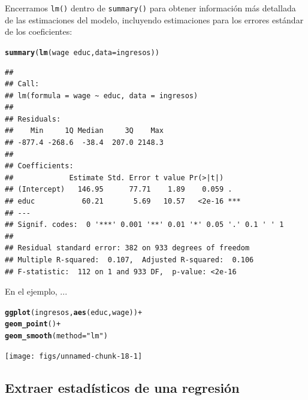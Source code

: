 \documentclass{article}\usepackage[]{graphicx}\usepackage[]{color}
\makeatletter
\newcommand{\hlstr}[1]{\textcolor[rgb]{0.192,0.494,0.8}{#1}}%
\newcommand{\hlopt}[1]{\textcolor[rgb]{0,0,0}{#1}}%
\newcommand{\hlstd}[1]{\textcolor[rgb]{0.345,0.345,0.345}{#1}}%
\newcommand{\hlkwc}[1]{\textcolor[rgb]{0.333,0.667,0.333}{#1}}%
\newcommand{\hlkwd}[1]{\textcolor[rgb]{0.737,0.353,0.396}{\textbf{#1}}}%
\newenvironment{kframe}{%
 \def\at@end@of@kframe{}%
 \ifinner\ifhmode%
  \def\at@end@of@kframe{\end{minipage}}%
  \begin{minipage}{\columnwidth}%
 \fi\fi%
 \def\FrameCommand##1{\hskip\@totalleftmargin \hskip-\fboxsep
 \colorbox{shadecolor}{##1}\hskip-\fboxsep
     \hskip-\linewidth \hskip-\@totalleftmargin \hskip\columnwidth}%
 \MakeFramed {\advance\hsize-\width
   \@totalleftmargin\z@ \linewidth\hsize
   \@setminipage}}%
 {\par\unskip\endMakeFramed%
 \at@end@of@kframe}
\newenvironment{knitrout}{}{} %
\makeatother
\begin{document}
Encerramos \verb|lm()| dentro de \verb|summary()| para obtener información más detallada de las estimaciones del modelo, incluyendo estimaciones para los errores estándar de los coeficientes:

\begin{knitrout}
\color{fgcolor}\begin{kframe}
\begin{alltt}
\hlkwd{summary}\hlstd{(}\hlkwd{lm}\hlstd{(wage} \hlopt{~} \hlstd{educ,} \hlkwc{data} \hlstd{= ingresos))}
\end{alltt}
\begin{verbatim}
## 
## Call:
## lm(formula = wage ~ educ, data = ingresos)
## 
## Residuals:
##    Min     1Q Median     3Q    Max 
## -877.4 -268.6  -38.4  207.0 2148.3 
## 
## Coefficients:
##             Estimate Std. Error t value Pr(>|t|)    
## (Intercept)   146.95      77.71    1.89    0.059 .  
## educ           60.21       5.69   10.57   <2e-16 ***
## ---
## Signif. codes:  0 '***' 0.001 '**' 0.01 '*' 0.05 '.' 0.1 ' ' 1
## 
## Residual standard error: 382 on 933 degrees of freedom
## Multiple R-squared:  0.107,	Adjusted R-squared:  0.106 
## F-statistic:  112 on 1 and 933 DF,  p-value: <2e-16
\end{verbatim}
\end{kframe}
\end{knitrout}

En el ejemplo, ...


\begin{knitrout}
\color{fgcolor}\begin{kframe}
\begin{alltt}
\hlkwd{ggplot}\hlstd{(ingresos,} \hlkwd{aes}\hlstd{(educ, wage))} \hlopt{+}
  \hlkwd{geom_point}\hlstd{()} \hlopt{+}
  \hlkwd{geom_smooth}\hlstd{(}\hlkwc{method} \hlstd{=} \hlstr{"lm"}\hlstd{)}
\end{alltt}
\end{kframe}

{\centering \texttt{[image: figs/unnamed-chunk-18-1]} 

}



\end{knitrout}


\subsection{Extraer estadísticos de una regresión}
\end{document}

